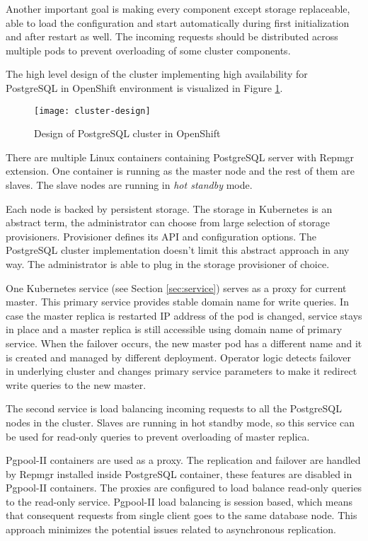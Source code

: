 \documentclass[
  digital, %
  twoside, %
  table,   %
  lof,     %
  lot,     %
]{fithesis3}
\begin{document}
Another important goal is making every component except storage replaceable, able to load the configuration and start automatically during first initialization and after restart as well. The incoming requests should be distributed across multiple pods to prevent overloading of some cluster components.

The high level design of the cluster implementing high availability for PostgreSQL in OpenShift environment is visualized in Figure \ref{fig:cluster_design}.

\begin{figure}[H]
\caption{Design of PostgreSQL cluster in OpenShift}
\centering
\texttt{[image: cluster-design]}
\label{fig:cluster_design}
\end{figure}

There are multiple Linux containers containing PostgreSQL server with Repmgr extension. One container is running as the master node and the rest of them are slaves. The slave nodes are running in \textit{hot standby} mode.

Each node is backed by persistent storage. The storage in Kubernetes is an abstract term, the administrator can choose from large selection of storage provisioners. Provisioner defines its API and configuration options.  The PostgreSQL cluster implementation doesn't limit this abstract approach in any way. The administrator is able to plug in the storage provisioner of choice.

One Kubernetes service (see Section \ref{sec:service}) serves as a proxy for current master. This primary service provides stable domain name for write queries. In case the master replica is restarted IP address of the pod is changed, service stays in place and a master replica is still accessible using domain name of primary service. When the failover occurs, the new master pod has a different name and it is created and managed by different deployment. Operator logic detects failover in underlying cluster and changes primary service parameters to make it redirect write queries to the new master.

The second service is load balancing incoming requests to all the PostgreSQL nodes in the cluster. Slaves are running in hot standby mode, so this service can be used for read-only queries to prevent overloading of master replica.

Pgpool-II containers are used as a proxy. The replication and failover are handled by Repmgr installed inside PostgreSQL container, these features are disabled in Pgpool-II containers. The proxies are configured to load balance read-only queries to the read-only service. Pgpool-II load balancing is session based, which means that consequent requests from single client goes to the same database node. This approach minimizes the potential issues related to asynchronous replication.
\end{document}
